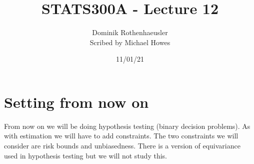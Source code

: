 




\title{STATS300A - Lecture 12}
\author{Dominik Rothenhaeusler\\ Scribed by Michael Howes}
\date{11/01/21}

\pagestyle{fancy}
\fancyhf{}


\maketitle
\tableofcontents
\section{Setting from now on}
From now on we will be doing hypothesis testing (binary decision problems). As with estimation we will have to add constraints. The two constraints we will consider are risk bounds and unbiasedness. There is a version of equivariance used in hypothesis testing but we will not study this.

